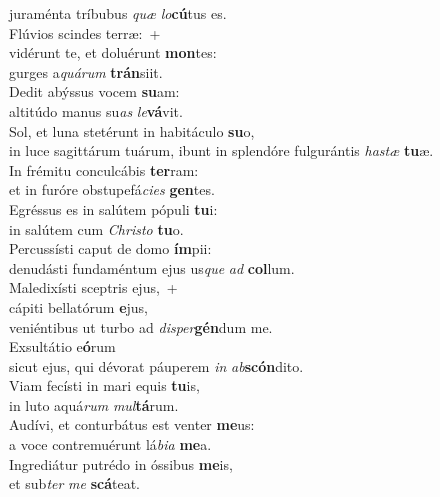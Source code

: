 \evenverse juraménta tríbubus \textit{quæ} \textit{lo}\textbf{cú}tus es.\\
\oddverse Flúvios scindes terræ:~+\\
\oddverse  vidérunt te, et doluérunt \textbf{mon}tes:~\*\\
\oddverse gurges a\textit{quá}\textit{rum} \textbf{trán}siit.\\
\evenverse Dedit abýssus vocem \textbf{su}am:~\*\\
\evenverse altitúdo manus su\textit{as} \textit{le}\textbf{vá}vit.\\
\oddverse Sol, et luna stetérunt in habitáculo \textbf{su}o,~\*\\
\oddverse in luce sagittárum tuárum, ibunt in splendóre fulgurántis \textit{ha}\textit{stæ} \textbf{tu}æ.\\
\evenverse In frémitu conculcábis \textbf{ter}ram:~\*\\
\evenverse et in furóre obstupefá\textit{ci}\textit{es} \textbf{gen}tes.\\
\oddverse Egréssus es in salútem pópuli \textbf{tu}i:~\*\\
\oddverse in salútem cum \textit{Chri}\textit{sto} \textbf{tu}o.\\
\evenverse Percussísti caput de domo \textbf{ím}pii:~\*\\
\evenverse denudásti fundaméntum ejus us\textit{que} \textit{ad} \textbf{col}lum.\\
\oddverse Maledixísti sceptris ejus,~+\\
\oddverse  cápiti bellatórum \textbf{e}jus,~\*\\
\oddverse veniéntibus ut turbo ad \textit{di}\textit{sper}\textbf{gén}dum me.\\
\evenverse Exsultátio e\textbf{ó}rum~\*\\
\evenverse sicut ejus, qui dévorat páuperem \textit{in} \textit{ab}\textbf{scón}dito.\\
\oddverse Viam fecísti in mari equis \textbf{tu}is,~\*\\
\oddverse in luto aquá\textit{rum} \textit{mul}\textbf{tá}rum.\\
\evenverse Audívi, et conturbátus est venter \textbf{me}us:~\*\\
\evenverse a voce contremuérunt lá\textit{bi}\textit{a} \textbf{me}a.\\
\oddverse Ingrediátur putrédo in óssibus \textbf{me}is,~\*\\
\oddverse et sub\textit{ter} \textit{me} \textbf{scá}teat.\\
